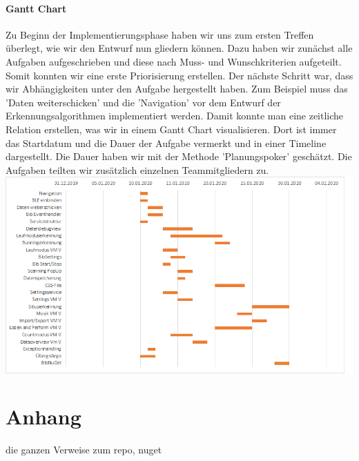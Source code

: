 \documentclass[a4paper,12pt]{article}
\begin{document}
\paragraph{Gantt Chart}
Zu Beginn der Implementierungsphase haben wir uns zum ersten Treffen überlegt, wie wir den Entwurf nun gliedern können. Dazu haben wir zunächst alle Aufgaben aufgeschrieben und diese nach Muss- und Wunschkriterien aufgeteilt. Somit konnten wir eine erste Priorisierung erstellen. Der nächste Schritt war, dass wir Abhängigkeiten unter den Aufgabe hergestellt haben. Zum Beispiel muss das 'Daten weiterschicken' und die 'Navigation' vor dem Entwurf der Erkennungsalgorithmen implementiert werden. Damit konnte man eine zeitliche Relation erstellen, was wir in einem Gantt Chart visualisieren. Dort ist immer das Startdatum und die Dauer der Aufgabe vermerkt und in einer Timeline dargestellt.
Die Dauer haben wir mit der Methode 'Planungspoker' geschätzt. Die Aufgaben teilten wir zusätzlich einzelnen Teammitgliedern zu.
\newline
\newline
\includegraphics[width=\textwidth, height=0.5\textheight]{bilder/Implementierungsplan.png}

\section{Anhang}
die ganzen Verweise zum repo, nuget


\printglossaries
{}
\end{document}
